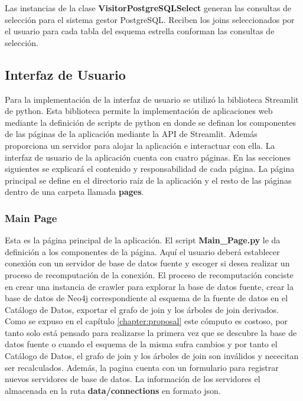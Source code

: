 Las instancias de la clase \textbf{VisitorPostgreSQLSelect} generan las consultas de selecci\'on para 
el sistema gestor PostgreSQL. Reciben los joins seleccionados por el usuario para cada tabla del esquema 
estrella conforman las consultas de selecci\'on.

\subsection{Interfaz de Usuario}

Para la implementaci\'on de la interfaz de usuario se utiliz\'o la biblioteca Streamlit de python. Esta biblioteca 
permite la implementaci\'on de aplicaciones web mediante la definici\'on de scripts de python en donde se 
definan los componentes de las p\'aginas de la aplicaci\'on mediante la API de Streamlit. Adem\'as proporciona un 
servidor para alojar la aplicación e interactuar con ella. La interfaz de usuario de la aplicaci\'on cuenta 
con cuatro p\'aginas. En las secciones siguientes se explicar\'a el contenido y responsabilidad de cada p\'agina. 
La p\'agina principal se define en el directorio ra\'iz de la aplicaci\'on y el resto de las p\'aginas dentro 
de una carpeta llamada \textbf{pages}.

\subsubsection{Main Page}

Esta es la p\'agina principal de la aplicaci\'on. El script \textbf{Main\_Page.py} le da definici\'on 
a los componentes de la p\'agina. Aqu\'i el usuario deber\'a establecer conexi\'on con un servidor de 
base de datos fuente y escoger si desea realizar un proceso de recomputaci\'on de la conexi\'on. El 
proceso de recomputaci\'on conciste en crear una instancia de crawler para explorar la base de datos 
fuente, crear la base de datos de Neo4j correspondiente al esquema de la fuente de datos en el Cat\'alogo 
de Datos, exportar el grafo de join y los \'arboles de join derivados. Como se expuso en el cap\'itulo 
\ref{chapter:proposal} este c\'omputo es costoso, por tanto solo est\'a pensado para realizarse la primera 
vez que se descubre la base de datos fuente o cuando el esquema de la misma sufra cambios y por tanto 
el Cat\'alogo de Datos, el grafo de join y los \'arboles de join son inv\'alidos y nececitan ser recalculados. 
Adem\'as, la pagina cuenta con un formulario para registrar nuevos servidores de base de datos. La informaci\'on 
de los servidores el almacenada en la ruta \textbf{data/connections} en formato json.

